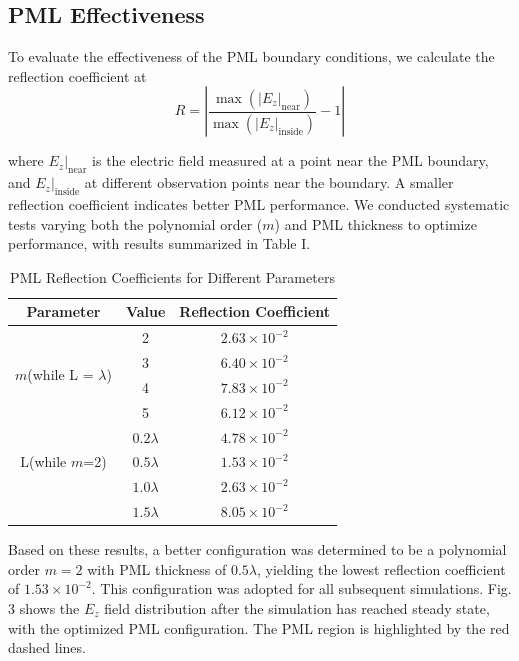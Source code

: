 \documentclass[journal]{IEEEtran}
\begin{document}
\subsection{PML Effectiveness}
To evaluate the effectiveness of the PML boundary conditions, we calculate the reflection coefficient at 
\begin{equation}
R = \left| \frac{\max(|E_z|_\text{near})}{\max(|E_z|_\text{inside})} - 1 \right|
\end{equation}

where $E_z|_\text{near}$ is the electric field measured at a point near the PML boundary, and $E_z|_\text{inside}$ 
at different observation points near the boundary. A smaller reflection coefficient indicates better PML performance. We conducted systematic tests varying both the polynomial order ($m$) and PML thickness to optimize performance, with results summarized in Table I.

\begin{table}[htbp]
\centering
\caption{PML Reflection Coefficients for Different Parameters}
\label{tab:pml_performance}
\begin{tabular}{|c|c|c|}
\hline
\textbf{Parameter} & \textbf{Value} & \textbf{Reflection Coefficient} \\
\hline
\multirow{4}{*}{$m$(while L = $\lambda$)} & 2 & $2.63 \times 10^{-2}$ \\
& 3 & $6.40 \times 10^{-2}$ \\
& 4 & $7.83 \times 10^{-2}$ \\
& 5 & $6.12 \times 10^{-2}$ \\
\hline
\multirow{3}{*}{L(while $m$=2)} & $0.2\lambda$ & $4.78 \times 10^{-2}$ \\
& $0.5\lambda$ & $1.53 \times 10^{-2}$ \\
& $1.0\lambda$ & $2.63 \times 10^{-2}$ \\
& $1.5\lambda$ & $8.05 \times 10^{-2}$ \\
\hline
\end{tabular}
\end{table}


Based on these results, a better configuration was determined to be a polynomial order $m=2$ with PML thickness of $0.5\lambda$, 
yielding the lowest reflection coefficient of $1.53 \times 10^{-2}$. This configuration was adopted for all subsequent simulations.
Fig. 3 shows the $E_z$ field distribution after the simulation has reached steady state, with the optimized PML configuration. The PML region is highlighted 
by the red dashed lines.
\end{document}
